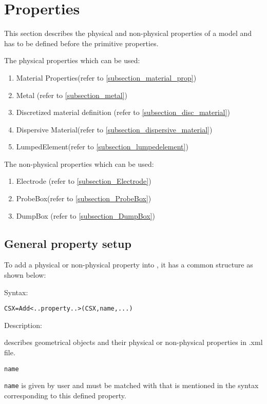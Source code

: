 \section{Properties}\label{csx_prop} 
This section describes the physical and non-physical properties of a model and has to be defined before the primitive properties. 


The physical properties which can be used: 
 
\begin{enumerate}
\item Material Properties(refer to \ref{subsection_material_prop})
\item Metal (refer to \ref{subsection_metal})
\item Discretized material definition (refer to \ref{subsection_disc_material})
\item Dispersive Material(refer to \ref{subsection_dispersive_material})
\item LumpedElement(refer to \ref{subsection_lumpedelement})
\end{enumerate}


The non-physical properties which can be used: 

\begin{enumerate}
\item Electrode (refer to \ref{subsection_Electrode})
\item ProbeBox(refer to \ref{subsection_ProbeBox})
\item DumpBox (refer to \ref{subsection_DumpBox})
\end{enumerate}


\subsection{General property setup}\label{subsection_gprop_setup}
To add a physical or non-physical property into \hyperref[CSX]{}, it has a common structure as shown below:

\begin{FontDescr}{Syntax:}
\begin{lstlisting} 
CSX=Add<..property..>(CSX,name,...)
\end{lstlisting} 
\end{FontDescr}

\begin{FontDescr}{Description:}
 \label{CSX}
\begin{myindentpar}
 describes geometrical objects and their physical or non-physical properties in .xml file.
\end{myindentpar}

\texttt{name} 
\begin{myindentpar}
\texttt{name} is given by user and must be matched with that is mentioned in the syntax corresponding to this defined property.  
\end{myindentpar}
\end{FontDescr}


